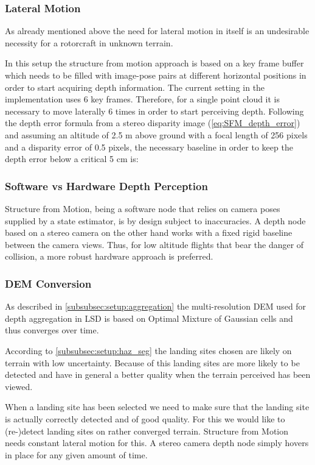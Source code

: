 \subsubsection{Lateral Motion}

As already mentioned above the need for lateral motion in itself is an undesirable necessity for a rotorcraft in unknown terrain. 

In this setup the structure from motion approach is based on a key frame buffer which needs to be filled with image-pose pairs at different horizontal positions in order to start acquiring depth information. The current setting in the implementation \citet{SFM} uses 6 key frames. Therefore, for a single point cloud it is necessary to move laterally 6 times in order to start perceiving depth. Following the depth error formula from a stereo disparity image (\ref{eq:SFM_depth_error}) and assuming an altitude of 2.5 m above ground with a focal length of 256 pixels and a disparity error of 0.5 pixels, the necessary baseline in order to keep the depth error below a critical 5 cm is:

\subsubsection{Software vs Hardware Depth Perception}

Structure from Motion, being a software node that relies on camera poses supplied by a state estimator, is by design subject to inaccuracies. A depth node based on a stereo camera on the other hand works with a fixed rigid baseline between the camera views. Thus, for low altitude flights that bear the danger of collision, a more robust hardware approach is preferred.

\subsubsection{DEM Conversion}

As described in \cref{subsubsec:setup:aggregation} the multi-resolution DEM used for depth aggregation in LSD is based on Optimal Mixture of Gaussian cells and thus converges over time. 

According to \cref{subsubsec:setup:haz_seg} the landing sites chosen are likely on terrain with low uncertainty. Because of this landing sites are more likely to be detected and have in general a better quality when the terrain perceived has been viewed.

When a landing site has been selected we need to make sure that the landing site is actually correctly detected and of good quality. For this we would like to (re-)detect landing sites on rather converged terrain. Structure from Motion needs constant lateral motion for this. A stereo camera depth node simply hovers in place for any given amount of time.

